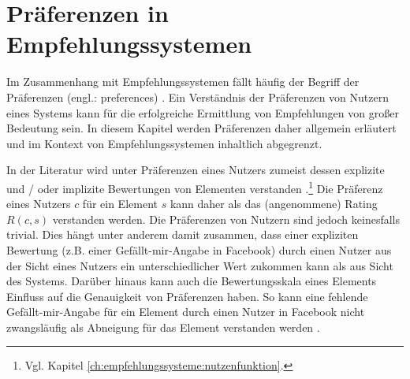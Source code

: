 \section{Präferenzen in Empfehlungssystemen}
\label{ch:empfehlungssysteme:preferences}
Im Zusammenhang mit Empfehlungssystemen fällt häufig der Begriff der Präferenzen (engl.: preferences) \cite[S. 11f.]{recommenderSystems:2016}\cite[S. 87]{ekstrand:article}\cite[S. 2429]{palomares:inproceedings}\cite[S. 2]{ricci:inbook}.
Ein Verständnis der Präferenzen von Nutzern eines Systems kann für die erfolgreiche Ermittlung von Empfehlungen von großer Bedeutung sein. %
In diesem Kapitel werden Präferenzen daher allgemein erläutert und im Kontext von Empfehlungssystemen inhaltlich abgegrenzt.


In der Literatur wird unter Präferenzen eines Nutzers zumeist dessen explizite und / oder implizite Bewertungen von Elementen verstanden \cite[S. 743]{adomavicius:inproceedings}\cite[S. 899]{adomavicius:article}\cite[S. 11]{recommenderSystems:2016}\cite[S. 37]{berkovsky:2:article}\cite[S. 129]{ekstrand:article}.\footnote{Vgl. Kapitel \ref{ch:empfehlungssysteme:nutzenfunktion}.}
Die Präferenz eines Nutzers $c$ für ein Element $s$ kann daher als das (angenommene) Rating $R(c,s)$ verstanden werden.
Die Präferenzen von Nutzern sind jedoch keinesfalls trivial.
Dies hängt unter anderem damit zusammen, dass einer expliziten Bewertung (z.B. einer Gefällt-mir-Angabe in Facebook) durch einen Nutzer aus der Sicht eines Nutzers ein unterschiedlicher Wert zukommen kann als aus Sicht des Systems.
Darüber hinaus kann auch die Bewertungsskala eines Elements Einfluss auf die Genauigkeit von Präferenzen haben.
So kann eine fehlende Gefällt-mir-Angabe für ein Element durch einen Nutzer in Facebook nicht zwangsläufig als Abneigung für das Element verstanden werden \cite[S. 11]{recommenderSystems:2016}.

